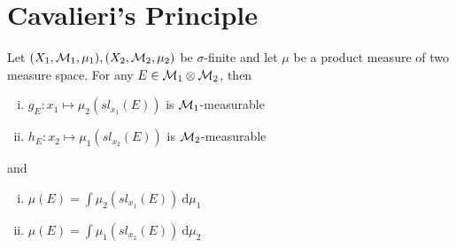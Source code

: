 \section{Cavalieri's Principle}

\begin{theorem}
  Let $(X_1, \mathcal M_1, \mu_1), (X_2, \mathcal M_2, \mu_2)$ be $\sigma$-finite and let $\mu$  be a product measure of two measure space.
  For any $E \in \mathcal M_1 \otimes \mathcal M_2$, then
  \begin{enumerate}[(i)]
    \item $g_E : x_1 \mapsto \mu_2(sl_{x_1}(E))$ is $\mathcal M_1$-measurable
    \item $h_E : x_2 \mapsto \mu_1(sl_{x_2}(E))$ is $\mathcal M_2$-measurable
  \end{enumerate}
  and 
  \begin{enumerate}[(i)]
    \item $\mu(E) = \int \mu_2(sl_{x_1}(E)) \ \mathrm{d}\mu_1$
    \item $\mu(E) = \int \mu_1(sl_{x_2}(E)) \ \mathrm{d}\mu_2$
  \end{enumerate}
\end{theorem}


